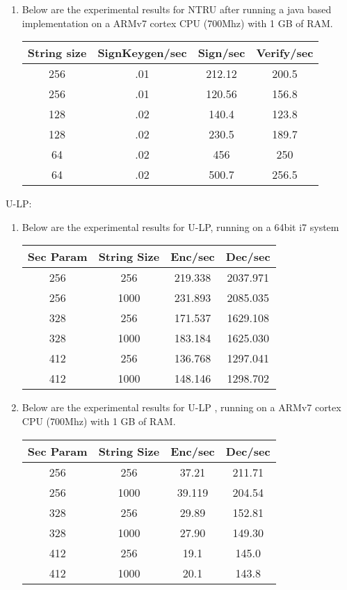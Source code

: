 \documentclass[conference]{IEEEtran}
\begin{document}
\begin{enumerate}
\begin{enumerate}
\item{ Below are the experimental results for NTRU after running a java based implementation on a ARMv7 cortex CPU (700Mhz) with 1 GB of RAM.}

\begin{center}
\small
\begin{tabular}{||c c c c||} 
\hline
String size & SignKeygen/sec & Sign/sec & Verify/sec \\ [0.5ex] 
\hline\hline
256 & .01 & 212.12 & 200.5\\ 
\hline
256 & .01 & 120.56 & 156.8\\
\hline
128 & .02 & 140.4 & 123.8\\
\hline
128 & .02 & 230.5 & 189.7\\
\hline
64 & .02 & 456 & 250\\
\hline
64 & .02 & 500.7 & 256.5 \\
\hline
\end{tabular}
\end{center}

\end{enumerate}

U-LP:
\begin{enumerate}

\item { Below are the experimental results for U-LP, running on a 64bit i7 system }
\begin{center}
\small
\begin{tabular}{||c c c c||} 
\hline
Sec Param & String Size & Enc/sec & Dec/sec \\ [0.4ex] 
\hline\hline
256 & 256 & 219.338 & 2037.971\\ 
\hline
256 & 1000 & 231.893  & 2085.035\\
\hline
328 & 256 & 171.537 & 1629.108\\
\hline
328 & 1000 & 183.184 & 1625.030\\
\hline
412 & 256 & 136.768 & 1297.041\\
\hline
412 & 1000 & 148.146 & 1298.702\\
\hline
\end{tabular}
\end{center}

\item {Below are the experimental results for U-LP , running on a ARMv7 cortex CPU (700Mhz) with 1 GB of RAM. }

\begin{center}
\small
\begin{tabular}{||c c c c||} 
\hline
Sec Param & String Size & Enc/sec & Dec/sec \\ [0.4ex] 
\hline\hline
256 & 256 & 37.21 & 211.71\\ 
\hline
256 & 1000 & 39.119  & 204.54\\
\hline
328 & 256 & 29.89 & 152.81\\
\hline
328 & 1000 & 27.90 & 149.30\\
\hline
412 & 256 & 19.1 & 145.0\\
\hline
412 & 1000 & 20.1 & 143.8\\


\end{tabular}
\end{center}
\end{enumerate}
\end{enumerate}
\end{document}
